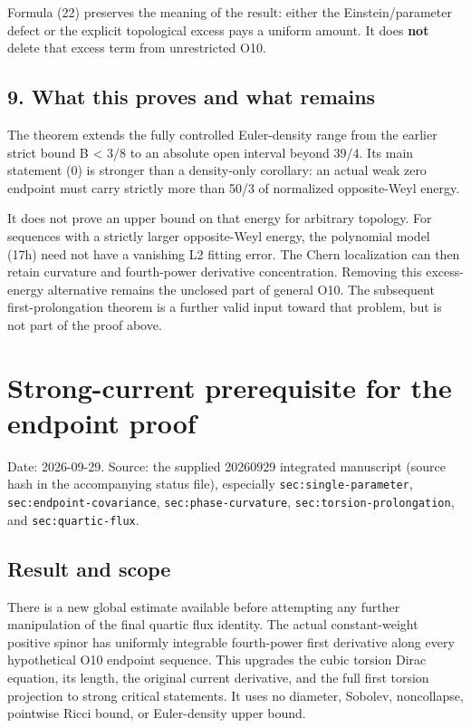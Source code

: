 \documentclass[11pt]{article}
\begin{document}
Formula (22) preserves the meaning of the result: either the
Einstein/parameter defect or the explicit topological excess pays a
uniform amount. It does \textbf{not} delete that excess term from
unrestricted O10.

\hypertarget{o10strength:what-this-proves-and-what-remains}{%
\subsection{9. What this proves and what
remains}\label{o10strength:what-this-proves-and-what-remains}}

The theorem extends the fully controlled Euler-density range from the
earlier strict bound B \textless{} 3/8 to an absolute open interval
beyond 39/4. Its main statement (0) is stronger than a density-only
corollary: an actual weak zero endpoint must carry strictly more than
50/3 of normalized opposite-Weyl energy.

It does not prove an upper bound on that energy for arbitrary topology.
For sequences with a strictly larger opposite-Weyl energy, the
polynomial model (17h) need not have a vanishing L2 fitting error. The
Chern localization can then retain curvature and fourth-power derivative
concentration. Removing this excess-energy alternative remains the
unclosed part of general O10. The subsequent first-prolongation theorem
is a further valid input toward that problem, but is not part of the
proof above.

\clearpage
\appendix
\hypertarget{strong-current-prerequisite-for-the-endpoint-proof}{%
\section{Strong-current prerequisite for the endpoint
proof}\label{strong-current-prerequisite-for-the-endpoint-proof}}

Date: 2026-09-29. Source: the supplied 20260929 integrated manuscript
(source hash in the accompanying status file), especially
\texttt{sec:single-parameter}, \texttt{sec:endpoint-covariance},
\texttt{sec:phase-curvature}, \texttt{sec:torsion-prolongation}, and
\texttt{sec:quartic-flux}.

\hypertarget{result-and-scope}{%
\subsection{Result and scope}\label{result-and-scope}}

There is a new global estimate available before attempting any further
manipulation of the final quartic flux identity. The actual
constant-weight positive spinor has uniformly integrable fourth-power
first derivative along every hypothetical O10 endpoint sequence. This
upgrades the cubic torsion Dirac equation, its length, the original
current derivative, and the full first torsion projection to strong
critical statements. It uses no diameter, Sobolev, noncollapse,
pointwise Ricci bound, or Euler-density upper bound.
\end{document}
